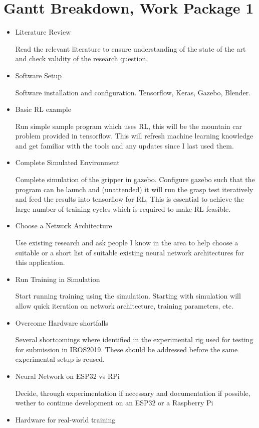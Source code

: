 \newpage

\section{Gantt Breakdown, Work Package 1}\label{GanttBreakdownWP1}
\begin{itemize}
    \item Literature Review
    
    Read the relevant literature to ensure understanding of the state of the art and check validity of the research question.
    \item Software Setup
    
    Software installation and configuration. Tensorflow, Keras, Gazebo, Blender.
    \item Basic RL example 
    
    Run simple sample program which uses RL, this will be the mountain car problem provided in tensorflow. This will refresh machine learning knowledge and get familiar with the tools and any updates since I last used them.
    \item Complete Simulated Environment 
    
    Complete simulation of the gripper in gazebo. Configure gazebo such that the program can be launch and (unattended) it will run the grasp test iteratively and feed the results into tensorflow for RL. This is essential to achieve the large number of training cycles which is required to make RL feasible.
    \item Choose a Network Architecture
    
    Use existing research and ask people I know in the area to help choose a suitable or a short list of suitable existing neural network architectures for this application.
    \item Run Training in Simulation
    
    Start running training using the simulation. Starting with simulation will allow quick iteration on network architecture, training parameters, etc.
    \item Overcome Hardware shortfalls
    
    Several shortcomings where identified in the experimental rig used for testing for submission in IROS2019. These should be addressed before the same experimental setup is reused.
    \item Neural Network on ESP32 vs RPi
    
    Decide, through experimentation if necessary and documentation if possible, wether to continue development on an ESP32 or a Raspberry Pi
    \item Hardware for real-world training 
    

\end{itemize}
